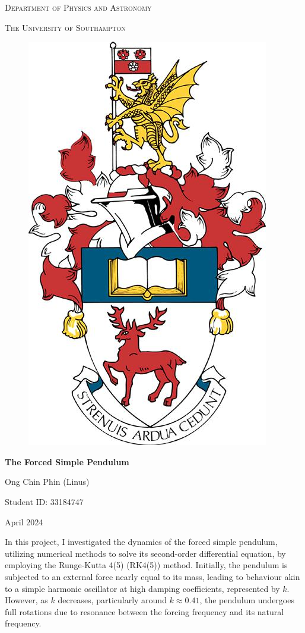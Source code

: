 \documentclass[10pt, twocolumn]{article}
\begin{document}
\begin{titlepage}
    \centering
    \vspace{1cm}
    {\scshape\Large Department of Physics and Astronomy \par}
    \vspace{1cm}
    {\scshape\Large The University of Southampton \par}
    \vspace{1cm}
    \begin{figure}[H]
        \centering
        \includegraphics[width = 0.2\columnwidth]{Projects/ForcedSimplePendulum/WrittenReport/figs/crest.jpg}
        \label{fig:enter-label}
    \end{figure}
    \vspace{0.5cm}
    {\huge\bfseries The Forced Simple Pendulum \par}
    \vspace{1cm}
    {\Large Ong Chin Phin (Linus) \par}
    \vspace{1cm}
    {\Large Student ID: 33184747 \par}
    \vfill
    {\large April 2024\par}
\end{titlepage}

\newpage
\onecolumn
\tableofcontents
\thispagestyle{empty}
\clearpage

\newpage
\thispagestyle{empty}
\begin{abstract}

\end{abstract}
In this project, I investigated the dynamics of the forced simple pendulum, utilizing numerical methods to solve its second-order differential equation, by employing the Runge-Kutta 4(5) (RK4(5)) method. Initially, the pendulum is subjected to an external force nearly equal to its mass, leading to behaviour akin to a simple harmonic oscillator at high damping coefficients, represented by $k$. However, as $k$ decreases, particularly around $k\approx 0.41$, the pendulum undergoes full rotations due to resonance between the forcing frequency and its natural frequency.
\end{document}
